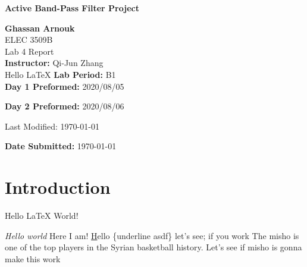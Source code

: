 \documentclass[hidelinks]{article}
\begin{document}
	\begin{titlepage}
		\begin{center}
			\vspace{1cm}
			{\LARGE\textbf{Active Band-Pass Filter Project}}
			
			\vspace{1.5cm}
			\textbf{\large Ghassan Arnouk}\\
			
			\vspace{1cm}
			\large ELEC 3509B\\
			\large Lab 4 Report\\
			
			
			\vspace{2cm}
			\textbf{Instructor:} Qi-Jun Zhang\\
			
            Hello \LaTeX			
			\vspace{1cm}
			\textbf{Lab Period:} B1\\
			
			\vspace{0.1cm}
			\textbf{Day 1 Preformed:} 2020/08/05
			
			\vspace{0.1cm}
			\textbf{Day 2 Preformed:} 2020/08/06
		
            Last Modified: \today

			\vspace{1cm}
			\textbf{Date Submitted:} \today\\			
		\end{center}
	\end{titlepage}
	
	\pagebreak
	
	
	
	
	\section{Introduction}
    Hello {\LaTeX} World!

    \emph{Hello world} Here I am!
    \underline Hello \{underline asdf\} let's see; if you work
    The \Gls{misho} is one of the top players in the Syrian basketball history.    
    Let's see if \gls{misho} is gonna make this work

    \clearpage

    \printglossary
\end{document}
